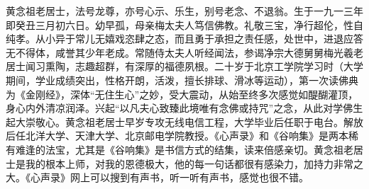 \begin{book}
    黄念祖老居士，法号龙尊，亦号心示、乐生，别号老念、不退翁。生于一九一三年即癸丑三月初六日。幼早孤，母亲梅太夫人笃信佛教。礼敬三宝，净行超伦，性自纯孝。从小异于常儿无嬉戏恣肆之态，而且勇于承担之责任感，处世中，进退应答无不得体，咸誉其少年老成。常随侍太夫人听经闻法，参谒净宗大德舅舅梅光羲老居士闻习熏陶，志趣超群，有深厚的福德夙根。二十岁于北京工学院学习时（大学期间，学业成绩突出，性格开朗，活泼，擅长排球、滑冰等运动），第一次读佛典为《金刚经》，深体“无住生心”之妙，受大震动，从始至终多次感觉如醍醐灌顶，身心内外清凉润泽。兴起“以凡夫心致臻此境唯有念佛或持咒”之念，从此对学佛生起大崇敬心。黄念祖老居士早岁专攻无线电信工程，大学毕业后任职于电台。解放后任北洋大学、天津大学、北京邮电学院教授。《心声录》和《谷响集》是两本稀有难逢的法宝，尤其是《谷响集》是书信方式的结集，读来倍感亲切。黄念祖老居士是我的根本上师，对我的恩德极大，他的每一句话都很有感染力，加持力非常之大。《心声录》网上可以搜到有声书，听一听有声书，感觉也很不错。
\end{book}
